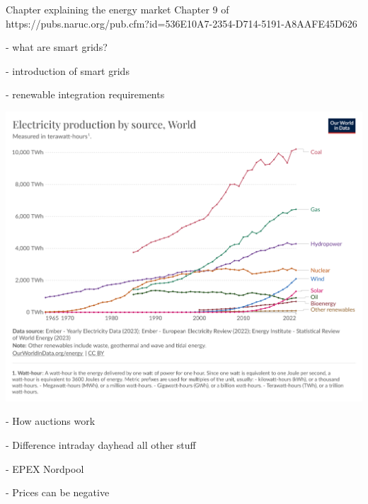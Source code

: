 Chapter explaining the energy market
Chapter 9 of https://pubs.naruc.org/pub.cfm?id=536E10A7-2354-D714-5191-A8AAFE45D626

- what are smart grids?

- introduction of smart grids 

- renewable integration requirements

\includegraphics[width=\textwidth]{images/electricity-production-by-source.png}

- How auctions work

- Difference intraday dayhead all other stuff

- EPEX Nordpool

- Prices can be negative

